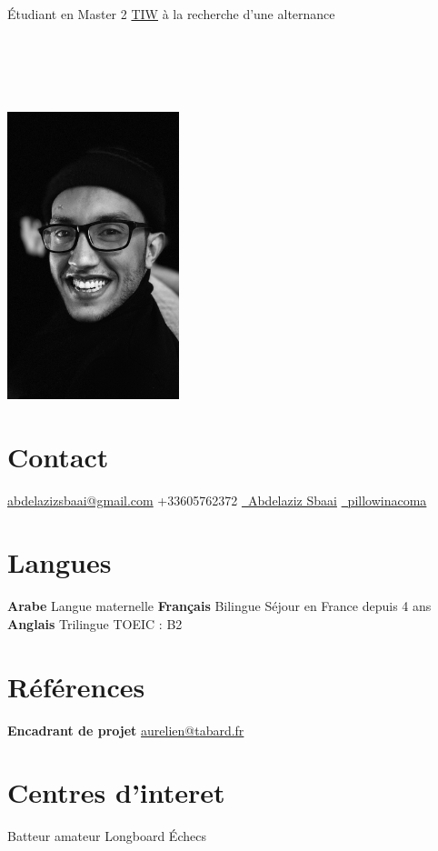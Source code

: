 \documentclass[]{friggeri-cv}
\begin{document}
      {Étudiant en Master 2 \href{http://master-info.univ-lyon1.fr/TIW/}{TIW} à la recherche d'une alternance}
    
\begin{aside}
  \section{ \ }
    \includegraphics[width=5cm]{me3.jpeg}
  \section{Contact}
    \vspace{0.5cm}
    \href{ mailto:abdelazizsbaai@gmail.com}{abdelazizsbaai@gmail.com}
    +33605762372
     \href{https://www.linkedin.com/in/abdelaziz-sbaai}{\linkedin \ Abdelaziz Sbaai}
     \href{https://github.com/pillowinacoma}{\github \ pillowinacoma}
    ~
  \section{Langues}
  \vspace{0.5cm}
  \textbf{Arabe}
  Langue maternelle
  \textbf{Français}
  Bilingue
  Séjour en France depuis 4 ans
  \textbf{Anglais}
  Trilingue 
  TOEIC : B2
    ~
  \section{Références}
  \vspace{0.5cm}
  \textbf{Encadrant de projet}
    \href{mailto:aurelien@tabard.fr}{aurelien@tabard.fr}
  \section{Centres d'interet}
  \vspace{0.5cm}
    Batteur amateur
    Longboard
    Échecs
\end{aside}
\end{document}
